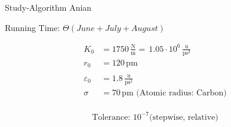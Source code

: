 \documentclass[14pt,c, german, aspectratio=169]{beamer} %
\begin{document}
\begin{frame}{Study-Algorithm Anian }

        \begin{algorithm}[H]
            \vspace{0.2cm}

        \end{algorithm}
        \vspace{1cm} 

        Running Time: $\Theta(June + July + August)$

\end{frame}

\begin{align*} K_0 &= 1750 \,\frac{\textrm{N}}{\textrm{m}} =\, 1.05\cdot 10^6\, \frac{\textrm{u}}{\textrm{ps}^2}\\
r_0 &= 120 \,\textrm{pm}\\
\\
\varepsilon_0 &= 1.8\, \frac{\textrm{u}}{\textrm{ps}^2}\\
\sigma &= 70 \,\textrm{pm (Atomic radius: Carbon)}\\
\end{align*}

\[\textrm{Tolerance: }10^{-7} \textrm{(stepwise, relative)}\]
\\
\end{document}
